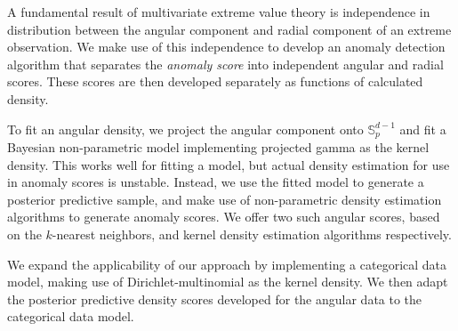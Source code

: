 
A fundamental result of multivariate extreme value theory is independence
    in distribution between the angular component and radial component of an
    extreme observation.   We make use of this independence to develop an 
    anomaly detection algorithm that separates the \emph{anomaly score} into 
    independent angular and radial scores.  These scores are then developed
    separately as functions of calculated density.

To fit an angular density, we project the angular component onto 
    $\mathbb{S}_p^{d-1}$ and fit a Bayesian non-parametric model implementing 
    projected gamma as the kernel density.  This works well for fitting a model, 
    but actual density estimation for use in anomaly scores is unstable.
    Instead, we use the fitted model to generate a posterior predictive sample, 
    and make use of non-parametric density estimation algorithms to generate
    anomaly scores.  We offer two such angular scores, based on the $k$-nearest
    neighbors, and kernel density estimation algorithms respectively.

We expand the applicability of our approach by implementing a categorical data
    model, making use of Dirichlet-multinomial as the kernel density.  We then 
    adapt the posterior predictive density scores developed for the angular 
    data to the categorical data model.


